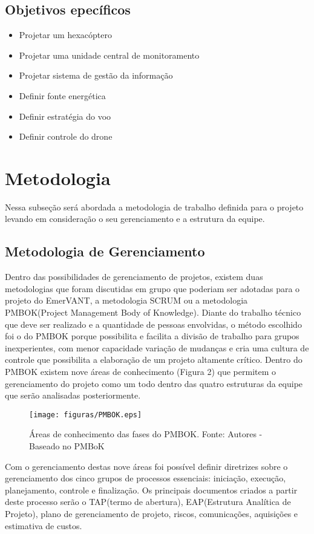 \subsection{Objetivos epecíficos}
\begin{itemize}
  \item Projetar um hexacóptero
  \item Projetar uma unidade central de monitoramento
	\item Projetar sistema de gestão da informação
	\item Definir fonte energética
	\item Definir estratégia do voo
	\item Definir controle do drone
\end{itemize}

\section{Metodologia}
Nessa subseção será abordada a metodologia de trabalho definida para o projeto levando em consideração o seu gerenciamento e a estrutura da equipe.
\subsection{Metodologia de Gerenciamento}

Dentro das possibilidades de gerenciamento de projetos, existem duas metodologias que foram discutidas em grupo que poderiam ser adotadas para o projeto do EmerVANT, a metodologia SCRUM ou a metodologia PMBOK(Project Management Body of Knowledge). Diante do trabalho técnico que deve ser realizado e a quantidade de pessoas envolvidas, o método escolhido foi o do PMBOK porque possibilita e facilita a divisão de trabalho para grupos inexperientes, com menor capacidade variação de mudanças e cria uma cultura de controle que possibilita a elaboração de um projeto altamente crítico. Dentro do PMBOK existem nove áreas de conhecimento (Figura 2) que permitem o gerenciamento do projeto como um todo dentro das quatro estruturas da equipe que serão analisadas posteriormente.

 \begin{figure}[ht]
	\centering
		\texttt{[image: figuras/PMBOK.eps]}
	\caption{Áreas de conhecimento das fases do PMBOK. Fonte: Autores - Baseado no PMBoK}
\end{figure}

Com o gerenciamento destas nove áreas foi possível definir diretrizes sobre o gerenciamento dos cinco grupos de processos essenciais: iniciação, execução, planejamento, controle e finalização. Os principais documentos criados a partir deste processo serão o TAP(termo de abertura), EAP(Estrutura Analítica de Projeto), plano de gerenciamento de projeto, riscos, comunicações, aquisições e estimativa de custos.

